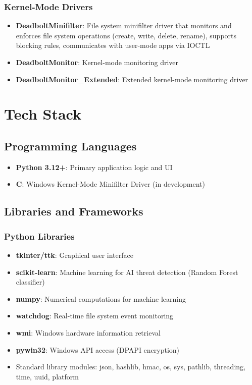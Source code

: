 \documentclass[12pt,letterpaper]{report}
\begin{document}
\subsection{Kernel-Mode Drivers}
\begin{itemize}
    \item \textbf{DeadboltMinifilter}: File system minifilter driver that monitors and enforces file system operations (create, write, delete, rename), supports blocking rules, communicates with user-mode apps via IOCTL
    \item \textbf{DeadboltMonitor}: Kernel-mode monitoring driver
    \item \textbf{DeadboltMonitor\_Extended}: Extended kernel-mode monitoring driver
\end{itemize}

\chapter{Tech Stack}
\section{Programming Languages}
\begin{itemize}
    \item \textbf{Python 3.12+}: Primary application logic and UI
    \item \textbf{C}: Windows Kernel-Mode Minifilter Driver (in development)
\end{itemize}

\section{Libraries and Frameworks}
\subsection{Python Libraries}
\begin{itemize}
    \item \textbf{tkinter/ttk}: Graphical user interface
    \item \textbf{scikit-learn}: Machine learning for AI threat detection (Random Forest classifier)
    \item \textbf{numpy}: Numerical computations for machine learning
    \item \textbf{watchdog}: Real-time file system event monitoring
    \item \textbf{wmi}: Windows hardware information retrieval
    \item \textbf{pywin32}: Windows API access (DPAPI encryption)
    \item Standard library modules: json, hashlib, hmac, os, sys, pathlib, threading, time, uuid, platform
\end{itemize}
\end{document}
